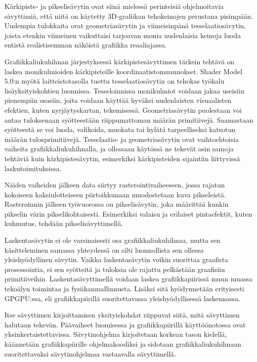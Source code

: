 \documentclass[finnish]{tktltiki2}
\theoremstyle{definition}
\theoremstyle{remark}
\begin{document}
Kärkipiste- ja pikselisävytin ovat siinä mielessä perinteisiä ohjelmoitavia sävyttimiä, että niitä on käytetty 3D-grafiikan tehokeinojen perustana pisimpään. Uudempia tulokkaita ovat geometriasävytin ja viimeisinpänä tesselaatiosävytin, joista etenkin viimeinen vaikuttaisi tarjoavan monia uudenlaisia keinoja luoda entistä realistisemman näköistä grafiikka reaaliajassa.

Grafiikkaliukuhihnan järjestyksessä kärkipistesävyttimen tärkein tehtävä on laskea monikulmioiden kärkipisteille koordinaatistomuunnokset. Shader Model 5.0:n myötä laitteistotasolla tuettu tesselaatiosävytin on tehokas työkalu lisäyksityiskohtien luonnissa. Tesseloinnissa monikulmiot voidaan jakaa useisiin pienempiin osasiin, joita voidaan käyttää hyväksi uudenlaisten visuaalisten efektien, kuten nyrjäytyskartan, tekemisessä. Geometriasävytin puolestaan voi antaa tuloksenaan syötteestään riippumattoman määrän primitiivejä. Saamastaan syötteestä se voi luoda, valikoida, muokata tai hylätä tarpeelliseksi katsotun määrän tulosprimitiivejä. Tesselaatio- ja geometriasävytin ovat vaihtoehtoisia vaiheita grafiikkaliukuhihnalla, ja ollessaan käytössä ne tekevät osin samoja tehtäviä kuin kärkipistesävytin, esimerkiksi kärkipisteiden sijaintiin liittyvissä laskutoimituksissa. 

Näiden vaiheiden jälkeen data siirtyy rasterointivaiheeseen, jossa rajatun kokoiseen kaksiulotteiseen piirtoikkunaan muodostetaan kuva pikseleistä. Rasteroinnin jälkeen työvuorossa on pikselisävytin, joka määrittää kunkin pikselin värin pikselikohtaisesti. Esimerkiksi valaisu ja erilaiset pintaefektit, kuten kuhmutus, tehdään pikselisävyttimellä.

Laskentasävytin ei ole varsinaisesti osa grafiikkaliukuhihnaa, mutta sen käsitteleminen samassa yhteydessä on silti luonnollista sen ollessa yleishyödyllinen sävytin. Vaikka laskentasävytin voikin suorittaa graafista prosessointia, ei sen syötteitä ja tuloksia ole rajattu pelkästään graafisiin primitiiveihin. Laskentasävyttimellä voidaan laskea grafiikkapiirissä muun muassa tekoälyn toimintaa ja fysiikanmallinnusta. Lisäksi sitä hyödynnetään erityisesti GPGPU:ssa, eli grafiikkapiirillä suoritettavassa yleishyödyllisessä laskennassa.

Itse sävyttimen kirjoittamisen yksityiskohdat riippuvat siitä, mitä sävyttimen halutaan tekevän. Päävaiheet luomisessa ja grafiikkapiirillä käyttöönotossa ovat yksinkertaistettavissa. Sävytinohjelma kirjoitetaan korkean tason kielellä, käännetään grafiikkapiirille ohjelmakoodiksi ja sidotaan grafiikkaliukuhihnaan suoritettavaksi sävytinohjelmaa vastaavalla sävyttimellä.
\end{document}
